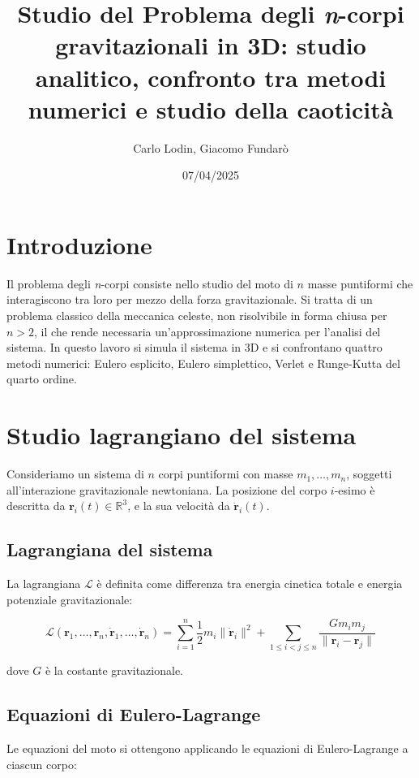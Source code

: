\documentclass[a4paper,12pt]{article}
\title{Studio del Problema degli \textit{n}-corpi gravitazionali in 3D: studio analitico, confronto tra metodi numerici e studio della caoticità}
\author{Carlo Lodin, Giacomo Fundarò}
\date{07/04/2025}
\begin{document}
\maketitle

\section{Introduzione}
Il problema degli \textit{n}-corpi consiste nello studio del moto di $n$ masse puntiformi che interagiscono tra loro per mezzo della forza gravitazionale. Si tratta di un problema classico della meccanica celeste, non risolvibile in forma chiusa per $n > 2$, il che rende necessaria un'approssimazione numerica per l'analisi del sistema. In questo lavoro si simula il sistema in 3D e si confrontano quattro metodi numerici: Eulero esplicito, Eulero simplettico, Verlet e Runge-Kutta del quarto ordine.


\section{Studio lagrangiano del sistema}

Consideriamo un sistema di \( n \) corpi puntiformi con masse \( m_1, \dots, m_n \), soggetti all'interazione gravitazionale newtoniana. La posizione del corpo \( i \)-esimo è descritta da \( \mathbf{r}_i(t) \in \mathbb{R}^3 \), e la sua velocità da \( \dot{\mathbf{r}}_i(t) \).

\subsection{Lagrangiana del sistema}

La lagrangiana \( \mathcal{L} \) è definita come differenza tra energia cinetica totale e energia potenziale gravitazionale:

\[
\mathcal{L}(\mathbf{r}_1, \dots, \mathbf{r}_n, \dot{\mathbf{r}}_1, \dots, \dot{\mathbf{r}}_n) = 
\sum_{i=1}^n \frac{1}{2} m_i \|\dot{\mathbf{r}}_i\|^2 + 
\sum_{1 \leq i < j \leq n} \frac{G m_i m_j}{\|\mathbf{r}_i - \mathbf{r}_j\|}
\]

dove \( G \) è la costante gravitazionale.

\subsection{Equazioni di Eulero-Lagrange}

Le equazioni del moto si ottengono applicando le equazioni di Eulero-Lagrange a ciascun corpo:
\end{document}
